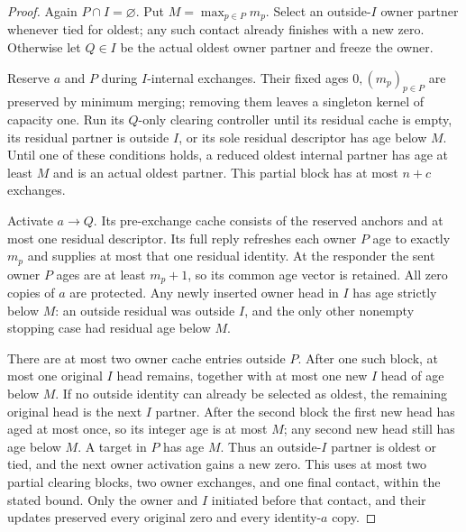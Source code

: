 \documentclass[11pt]{article}
\begin{document}
\begin{proof}
Again $P\cap I=\varnothing$. Put $M=\max_{p\in P}m_p$.
Select an outside-$I$ owner partner whenever tied for
oldest; any such contact already finishes with a new
zero. Otherwise let $Q\in I$ be the actual oldest
owner partner and freeze the owner.

Reserve $a$ and $P$ during $I$-internal exchanges.
Their fixed ages $0,(m_p)_{p\in P}$ are preserved
by minimum merging; removing them leaves a singleton
kernel of capacity one. Run its $Q$-only clearing
controller until its residual cache is empty, its
residual partner is outside $I$, or its sole residual
descriptor has age below $M$. Until one of these
conditions holds, a reduced oldest internal partner
has age at least $M$ and is an actual oldest partner.
This partial block has at most $n+c$ exchanges.

Activate $a\to Q$. Its pre-exchange cache consists
of the reserved anchors and at most one residual
descriptor. Its full reply refreshes each owner
$P$ age to exactly $m_p$ and supplies at most that
one residual identity. At the responder the sent
owner $P$ ages are at least $m_p+1$, so its common
age vector is retained. All zero copies of $a$ are
protected. Any newly inserted owner head in $I$
has age strictly below $M$: an outside residual
was outside $I$, and the only other nonempty stopping
case had residual age below $M$.

There are at most two owner cache entries outside
$P$. After one such block, at most one original
$I$ head remains, together with at most one new
$I$ head of age below $M$. If no outside identity
can already be selected as oldest, the remaining
original head is the next $I$ partner. After the
second block the first new head has aged at most
once, so its integer age is at most $M$; any second
new head still has age below $M$. A target in $P$
has age $M$. Thus an outside-$I$ partner is oldest
or tied, and the next owner activation gains a new
zero. This uses at most two partial clearing blocks,
two owner exchanges, and one final contact, within
the stated bound. Only the owner and $I$ initiated
before that contact, and their updates preserved
every original zero and every identity-$a$ copy.
\end{proof}
\end{document}
